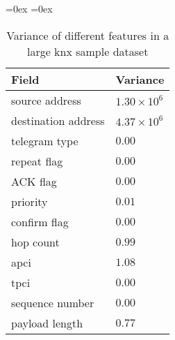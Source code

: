 
\begin{wraptable}{r}{0.5\textwidth}
	\aboverulesep=0ex
	\belowrulesep=0ex
	\renewcommand{\arraystretch}{1.2}
	
	\centering
	\begin{tabularx}{0.5\textwidth}{|l|Z|}
		\toprule
		\textbf{Field} & \textbf{Variance} \\\midrule
		source address & $1.30 \times 10^6$ \\
		destination address & $4.37 \times 10^6$ \\
		telegram type & $0.00$ \\
		repeat flag & $0.00$ \\
		ACK flag & $0.00$ \\
		priority & $0.01$ \\
		confirm flag & $0.00$ \\
		hop count & $0.99$ \\
		\gls{apci} & $1.08$ \\
		\gls{tpci} & $0.00$ \\
		sequence number & $0.00$ \\
		payload length & $0.77$ \\
		\bottomrule
	\end{tabularx}
	\caption[Variance of different features in a KNX sample]{Variance of different features in a large \gls{knx} sample dataset}
	\label{tab:concept:anal:feature-vector:var}
\end{wraptable}